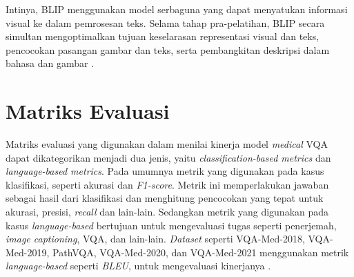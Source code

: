\par Intinya, BLIP menggunakan model serbaguna yang dapat menyatukan informasi visual ke dalam pemrosesan teks. Selama tahap pra-pelatihan, BLIP secara simultan mengoptimalkan tujuan keselarasan representasi visual dan teks, pencocokan pasangan gambar dan teks, serta pembangkitan deskripsi dalam bahasa dan gambar \citep{li2022blip}.




\section{Matriks Evaluasi}

\par Matriks evaluasi yang digunakan dalam menilai kinerja model \textit{medical} VQA dapat dikategorikan menjadi dua jenis, yaitu \textit{classification-based metrics} dan \textit{language-based metrics}. Pada umumnya metrik yang digunakan pada kasus klasifikasi, seperti akurasi dan \textit{F1-score}. Metrik ini memperlakukan jawaban sebagai hasil dari klasifikasi dan menghitung pencocokan yang tepat untuk akurasi, presisi, \textit{recall} dan lain-lain. Sedangkan metrik yang digunakan pada kasus \textit{language-based} bertujuan untuk mengevaluasi tugas seperti penerjemah, \textit{image captioning}, VQA, dan lain-lain. \textit{Dataset} seperti VQA-Med-2018, VQA-Med-2019, PathVQA, VQA-Med-2020, dan VQA-Med-2021 menggunakan metrik \textit{language-based} seperti \textit{BLEU}, untuk mengevaluasi kinerjanya \citep{lin2023medical}.

